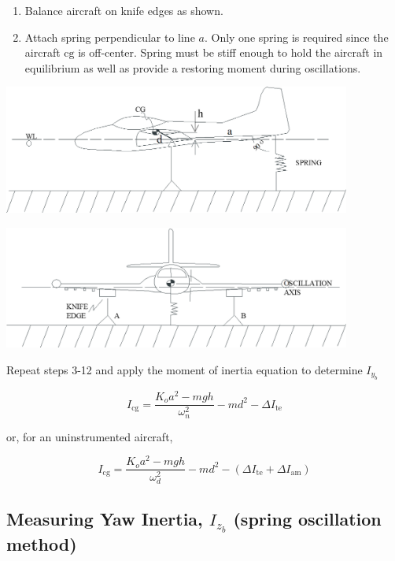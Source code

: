 \documentclass[
]{book}
\providecommand{\tightlist}{%
  \setlength{\itemsep}{0pt}\setlength{\parskip}{0pt}}
\begin{document}
\begin{enumerate}
\def\labelenumi{\arabic{enumi}.}
\tightlist
\item
  Balance aircraft on knife edges as shown.
\item
  Attach spring perpendicular to line \(a\). Only one spring is required since the aircraft \(\mathrm{cg}\) is off-center. Spring must be stiff enough to hold the aircraft in equilibrium as well as provide a restoring moment during oscillations.
\end{enumerate}

\includegraphics[width=4.5in,height=1.66667in]{media/07/image32.png}

\includegraphics[width=4.5in,height=1.58333in]{media/07/image33.png}

Repeat steps 3-12 and apply the moment of inertia equation to determine \(I_{y_b}\)

\[ I_{\mathrm{cg}} = \frac{K_o a^2 - mgh}{\omega_n^2} - md^2 - \Delta I_{\mathrm{te}} \]

or, for an uninstrumented aircraft,

\[ I_{\mathrm{cg}} = \frac{K_o a^2 - mgh}{\omega_d^2} - md^2 - \left(\Delta I_{\mathrm{te}} + \Delta I_{\mathrm{am}} \right) \]

\hypertarget{measuring-yaw-inertia-i_z_b-spring-oscillation-method}{%
\subsection{\texorpdfstring{Measuring Yaw Inertia, \(I_{z_b}\) (spring oscillation method)}{Measuring Yaw Inertia, I\_\{z\_b\} (spring oscillation method)}}\label{measuring-yaw-inertia-i_z_b-spring-oscillation-method}}
\end{document}
